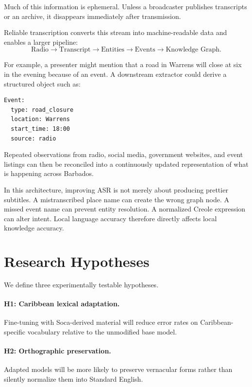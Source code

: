 \documentclass[10pt,twocolumn]{article}
\begin{document}
Much of this information is ephemeral. Unless a broadcaster publishes transcripts or an archive, it disappears immediately after transmission.

Reliable transcription converts this stream into machine-readable data and enables a larger pipeline:
\begin{equation}
\text{Radio} \rightarrow \text{Transcript} \rightarrow \text{Entities} \rightarrow \text{Events} \rightarrow \text{Knowledge Graph}.
\end{equation}

For example, a presenter might mention that a road in Warrens will close at six in the evening because of an event. A downstream extractor could derive a structured object such as:
\begin{verbatim}
Event:
  type: road_closure
  location: Warrens
  start_time: 18:00
  source: radio
\end{verbatim}

Repeated observations from radio, social media, government websites, and event listings can then be reconciled into a continuously updated representation of what is happening across Barbados.

In this architecture, improving ASR is not merely about producing prettier subtitles. A mistranscribed place name can create the wrong graph node. A missed event name can prevent entity resolution. A normalized Creole expression can alter intent. Local language accuracy therefore directly affects local knowledge accuracy.

\section{Research Hypotheses}
We define three experimentally testable hypotheses.

\paragraph{H1: Caribbean lexical adaptation.} Fine-tuning with Soca-derived material will reduce error rates on Caribbean-specific vocabulary relative to the unmodified base model.

\paragraph{H2: Orthographic preservation.} Adapted models will be more likely to preserve vernacular forms rather than silently normalize them into Standard English.
\end{document}
